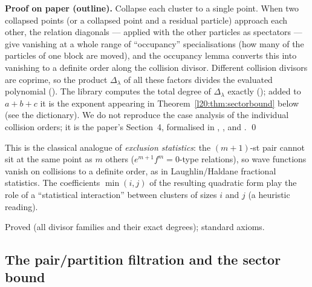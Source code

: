 \textbf{Proof on paper (outline).} Collapse each cluster to a single point. When two collapsed points (or a
collapsed point and a residual particle) approach each other, the relation diagonals --- applied with the
other particles as spectators --- give vanishing at a whole range of ``occupancy'' specialisations (how many of
the particles of one block are moved), and the occupancy lemma converts this into vanishing to a definite order
along the collision divisor. Different collision divisors are coprime, so the product $\Delta_\lambda$ of all these
factors divides the evaluated polynomial (). The library computes
the total degree of $\Delta_\lambda$ exactly (); added to $a+b+c$ it is the exponent appearing in
Theorem~\ref{l20:thm:sectorbound} below (see the dictionary). We do not reproduce the case analysis of the individual collision orders; it is the paper's
Section~4, formalised in , ,
 and . \qed

\begin{physics}
This is the classical analogue of \emph{exclusion statistics}: the $(m+1)$-st pair cannot sit at the same
point as $m$ others ($e^{m+1}f^m=0$-type relations), so wave functions vanish on collisions to a definite order,
as in Laughlin/Haldane fractional statistics. The coefficients $\min(i,j)$ of the resulting quadratic form play
the role of a ``statistical interaction'' between clusters of sizes $i$ and $j$ (a heuristic reading).
\end{physics}

\begin{status}
Proved (all divisor families and their exact degrees); standard axioms.
\end{status}

\subsection{The pair/partition filtration and the sector bound}

